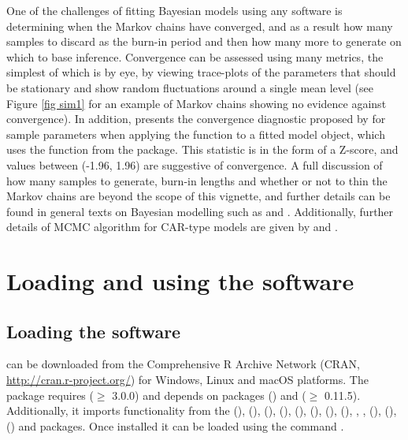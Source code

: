 \documentclass[article, nojss]{jss}
\begin{document}
One of the challenges of fitting Bayesian models using any software is determining when the Markov chains have converged, and as a result how many samples to discard as the burn-in period and then how many more to generate on which to base inference. Convergence can be assessed using many metrics, the simplest of which is by eye, by viewing trace-plots of the parameters that should be stationary and show random fluctuations around a single mean level (see Figure \ref{fig sim1} for an example of Markov chains showing no evidence against convergence). In addition,  presents the convergence  diagnostic proposed by \cite{geweke1992} for sample parameters when applying the  function to a fitted model object, which uses the  function from the  package. This statistic is in the form of a Z-score, and values between (-1.96, 1.96) are suggestive of convergence. A full discussion of how many samples to generate, burn-in lengths and whether or not to thin the Markov chains are beyond the scope of this vignette, and further details can be found in general texts on Bayesian modelling such as \cite{robert2010} and \cite{gelman2013}. Additionally, further details of MCMC algorithm for CAR-type models are given by \cite{GMRFbook} and \cite{gerber2015}.


\section{Loading and using the software}\label{section3}

\subsection{Loading the software}
 can be downloaded from the Comprehensive R Archive Network (CRAN, \url{http://cran.r-project.org/}) for Windows, Linux and macOS platforms.  The package requires  ($\geq$ 3.0.0) and depends on packages  (\citealp{mass2002}) and  ($\geq$ 0.11.5). Additionally, it imports functionality from the  (\citealp{carbayesdata}),   (\citealp{coda2006}),  (\citealp{dplyr2015}),  (\citealp{gtools}),  (\citealp{leaflet}),   (\citealp{matrixcalc2012}),  (\citealp{bivand2013}),  (\citealp{spam2010}), , ,  (\citealp{testthat}),  (\citealp{truncdist2012}),  (\citealp{truncnorm2014}) and  packages. Once installed it can be loaded using the command .\\
\end{document}
